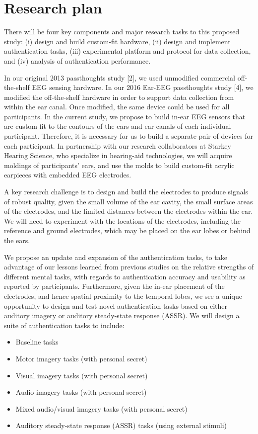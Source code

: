 \documentclass[11pt]{article}
\begin{document}
\section{Research plan}
\label{sec:orgad6a419}

There will be four key components and major research tasks to this proposed
study: (i) design and build custom-fit hardware, (ii) design and implement
authentication tasks, (iii) experimental platform and protocol for data collection,
and (iv) analysis of authentication performance.

In our original 2013 passthoughts study [2], we used unmodified commercial off-
the-shelf EEG sensing hardware. In our 2016 Ear-EEG passthoughts study [4],
we modified the off-the-shelf hardware in order to support data collection from
within the ear canal. Once modified, the same device could be used for all
participants. In the current study, we propose to build in-ear EEG sensors that
are custom-fit to the contours of the ears and ear canals of each individual
participant. Therefore, it is necessary for us to build a separate pair of devices for
each participant. In partnership with our research collaborators at Starkey
Hearing Science, who specialize in hearing-aid technologies, we will acquire
moldings of participants’ ears, and use the molds to build custom-fit acrylic
earpieces with embedded EEG electrodes.

A key research challenge is to design and build the electrodes to produce signals
of robust quality, given the small volume of the ear cavity, the small surface
areas of the electrodes, and the limited distances between the electrodes within
the ear. We will need to experiment with the locations of the electrodes, including
the reference and ground electrodes, which may be placed on the ear lobes or
behind the ears.

We propose an update and expansion of the authentication tasks, to take
advantage of our lessons learned from previous studies on the relative strengths
of different mental tasks, with regards to authentication accuracy and usability as
reported by participants. Furthermore, given the in-ear placement of the
electrodes, and hence spatial proximity to the temporal lobes, we see a unique
opportunity to design and test novel authentication tasks based on either auditory
imagery or auditory steady-state response (ASSR). We will design a suite of
authentication tasks to include:

\begin{itemize}
\item Baseline tasks
\item Motor imagery tasks (with personal secret)
\item Visual imagery tasks (with personal secret)
\item Audio imagery tasks (with personal secret)
\item Mixed audio/visual imagery tasks (with personal secret)
\item Auditory steady-state response (ASSR) tasks (using external stimuli)
\end{itemize}
\end{document}
